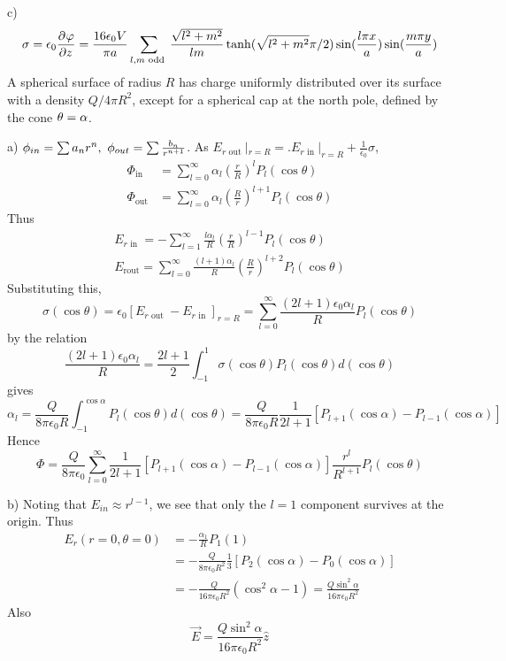 \documentclass[UTF8,9pt]{ctexart}
\begin{document}
c) 
$$\sigma = \epsilon_0 \frac{\partial^{} \varphi}{\partial {z}^{}} = \frac{16 \epsilon_{0} V}{\pi a} \sum_{l, m \text { odd }} \frac{\sqrt{l^{2}+m^{2}}}{l m} \tanh (\sqrt{l^{2}+m^{2}} \pi / 2) \sin (\frac{l \pi x}{a}) \sin (\frac{m \pi y}{a})$$
A spherical surface of radius $R$ has charge uniformly distributed over its surface with a density $Q/4\pi R^2$, except for a spherical cap at the north pole, defined by the cone $\theta=\alpha$.

a) 
$\phi_{in}=\sum a_nr^n,\ \phi_{out}=\sum\f{b_n}{r^{n+1}}$. As $E_{r \text { out }}|_{r=R}=.E_{r \text { in }}|_{r=R}+\frac{1}{\epsilon_{0}} \sigma$, 
$$\begin{aligned} 
    \Phi_{\mathrm{in}} &=\sum_{l=0}^{\infty} \alpha_{l}(\frac{r}{R})^{l} P_{l}(\cos \theta) \\ 
\Phi_{\mathrm{out}} &=\sum_{l=0}^{\infty} \alpha_{l}(\frac{R}{r})^{l+1} P_{l}(\cos \theta) 
\end{aligned}$$
Thus
$$\begin{array}{l}{E_{r \text { in }}=-\sum_{l=1}^{\infty} \frac{l \alpha_{l}}{R}(\frac{r}{R})^{l-1} P_{l}(\cos \theta)} \\ {E_{\text {rout}}=\sum_{l=0}^{\infty} \frac{(l+1) \alpha_{l}}{R}(\frac{R}{r})^{l+2} P_{l}(\cos \theta)}\end{array}$$
    Substituting this,
$$\sigma(\cos \theta)=\epsilon_{0}[E_{r \text { out }}-E_{r \text { in }}]_{r=R}=\sum_{l=0}^{\infty} \frac{(2 l+1) \epsilon_{0} \alpha_{l}}{R} P_{l}(\cos \theta)$$
by the relation
$$\frac{(2 l+1) \epsilon_{0} \alpha_{l}}{R}=\frac{2 l+1}{2} \int_{-1}^{1} \sigma(\cos \theta) P_{l}(\cos \theta) d(\cos \theta)$$
gives
$$ 
\alpha_{l}=\frac{Q}{8 \pi \epsilon_{0} R} \int_{-1}^{\cos \alpha} P_{l}(\cos \theta) d(\cos \theta)=\frac{Q}{8 \pi \epsilon_{0} R} \frac{1}{2 l+1}[P_{l+1}(\cos \alpha)-P_{l-1}(\cos \alpha)]
 $$
Hence
$$ 
\Phi=\frac{Q}{8 \pi \epsilon_{0}} \sum_{l=0}^{\infty} \frac{1}{2 l+1}[P_{l+1}(\cos \alpha)-P_{l-1}(\cos \alpha)] \frac{r^{l}}{R^{l+1}} P_{l}(\cos \theta)
 $$

b) Noting that $E_{in} \approx r^{l-1}$, we see that only the $l = 1$ component survives at the origin. Thus
$$ 
\begin{aligned} E_{r}(r=0, \theta=0) &=-\frac{\alpha_{1}}{R} P_{1}(1) \\ &=-\frac{Q}{8 \pi \epsilon_{0} R^{2}} \frac{1}{3}\left[P_{2}(\cos \alpha)-P_{0}(\cos \alpha)\right] \\ &=-\frac{Q}{16 \pi \epsilon_{0} R^{2}}(\cos ^{2} \alpha-1)=\frac{Q \sin ^{2} \alpha}{16 \pi \epsilon_{0} R^{2}} \end{aligned}
 $$
Also
 $$ 
\vec{E}=\frac{Q \sin ^{2} \alpha}{16 \pi \epsilon_{0} R^{2}} \hat{z}
 $$
\end{document}
